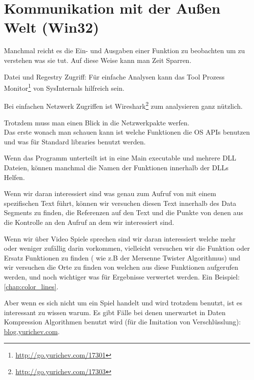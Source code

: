 \section{Kommunikation mit der Außen Welt (Win32)}

Manchmal reicht es die Ein- und Ausgaben einer Funktion zu beobachten um zu verstehen was sie tut.
Auf diese Weise kann man Zeit Sparren.

Datei und Regestry Zugriff:
F\"ur einfache Analysen kann das Tool Prozess Monitor\footnote{\url{http://go.yurichev.com/17301}}
von SysInternals hilfreich sein.

Bei einfachen Netzwerk Zugriffen ist Wireshark\footnote{\url{http://go.yurichev.com/17303}} zum analysieren ganz n\"utzlich.

Trotzdem muss man einen Blick in die Netzwerkpakte werfen.
\\
Das erste wonach man schauen kann ist welche Funktionen die \ac{OS} \ac{API}s benutzen und was f\"ur Standard libraries
benutzt werden. 

Wenn das Programm unterteilt ist in eine Main executable und mehrere DLL Dateien, k\"onnen manchmal die Namen der Funktionen innerhalb
der DLLs Helfen. 

Wenn wir daran interessiert sind was genau zum Aufruf von  mit einem spezifischen Text f\"uhrt,
k\"onnen wir versuchen diesen Text innerhalb des Data Segments zu finden, die Referenzen auf den Text und die 
Punkte von denen aus die Kontrolle an den  Aufruf an dem wir interessiert sind. %

Wenn wir \"uber Video Spiele sprechen sind wir daran interessiert welche mehr oder weniger zuf\"allig darin vorkommen, %
vielleicht versuchen wir die \rand Funktion oder Ersatz Funktionen zu finden ( wie z.B der Mersenne Twister Algorithmus) 
und wir versuchen die Orte zu finden von welchen aus diese Funktionen aufgerufen werden, und noch wichtiger was f\"ur
Ergebnisse verwertet werden. 
Ein Beispiel: \ref{chap:color_lines}.

Aber wenn es sich nicht um ein Spiel handelt und \rand wird trotzdem benutzt, ist es interessant zu wissen warum.
Es gibt F\"alle bei denen unerwartet \rand in Daten Kompression Algorithmen benutzt wird (f\"ur die Imitation von Verschl\"usslung):
\href{http://go.yurichev.com/17221}{blog.yurichev.com}.

